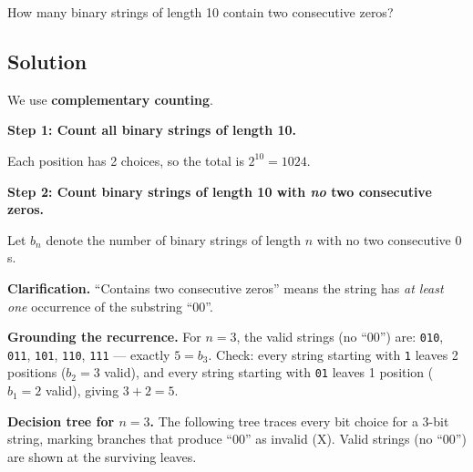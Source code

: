 \documentclass[12pt, a4paper]{article}
\begin{document}
\begin{problembox}
How many binary strings of length 10 contain two consecutive zeros?
\end{problembox}

\subsection*{Solution}

We use \textbf{complementary counting}.

\textbf{Step 1: Count all binary strings of length 10.}

Each position has 2 choices, so the total is $2^{10} = 1024$.

\textbf{Step 2: Count binary strings of length 10 with \emph{no} two consecutive zeros.}

Let $b_n$ denote the number of binary strings of length $n$ with no two
consecutive $0$s.

\textbf{Clarification.}\; ``Contains two consecutive zeros'' means the string has \emph{at least one} occurrence of the substring ``$00$''.

\textbf{Grounding the recurrence.}\; For $n = 3$, the valid strings (no ``$00$'') are:
\texttt{010}, \texttt{011}, \texttt{101}, \texttt{110}, \texttt{111} --- exactly $5 = b_3$.
Check: every string starting with \texttt{1} leaves 2 positions ($b_2 = 3$ valid), and every string starting with \texttt{01} leaves 1 position ($b_1 = 2$ valid), giving $3 + 2 = 5$. \checkmark

\medskip
\textbf{Decision tree for $n = 3$.}\;
The following tree traces every bit choice for a 3-bit string,
marking branches that produce ``$00$'' as invalid (\textcolor{setB}{\textsf{X}}).
Valid strings (no ``$00$'') are shown at the surviving leaves.
\end{document}
